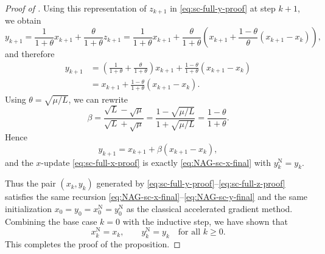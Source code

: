 \documentclass[10pt]{article}
\begin{document}
\begin{proof}[Proof of ]
Using this representation of \(z_{k+1}\) in \eqref{eq:sc-full-y-proof}
at step \(k+1\), we obtain
\[
y_{k+1}
=
\frac{1}{1+\theta}x_{k+1} + \frac{\theta}{1+\theta}z_{k+1}
=
\frac{1}{1+\theta}x_{k+1}
+
\frac{\theta}{1+\theta}\left(
x_{k+1} + \frac{1-\theta}{\theta}(x_{k+1}-x_k)
\right),
\]
and therefore
\begin{align*}
y_{k+1}
&=
\left(\frac{1}{1+\theta}+\frac{\theta}{1+\theta}\right)x_{k+1}
+
\frac{1-\theta}{1+\theta}(x_{k+1}-x_k)\\
&=
x_{k+1} + \frac{1-\theta}{1+\theta}(x_{k+1}-x_k).
\end{align*}
Using $\theta=\sqrt{\mu/L}$, we can rewrite
\[
\beta
=
\frac{\sqrt{L}-\sqrt{\mu}}{\sqrt{L}+\sqrt{\mu}}
=
\frac{1-\sqrt{\mu/L}}{1+\sqrt{\mu/L}}
=
\frac{1-\theta}{1+\theta}.
\]
Hence
\[
y_{k+1}
=
x_{k+1} + \beta(x_{k+1}-x_k),
\]
and the $x$-update \eqref{eq:sc-full-x-proof} is exactly
\eqref{eq:NAG-sc-x-final} with $y_k^{\mathrm N}=y_k$.

Thus the pair \((x_k,y_k)\) generated by
\eqref{eq:sc-full-y-proof}--\eqref{eq:sc-full-z-proof} satisfies the
same recursion \eqref{eq:NAG-sc-x-final}--\eqref{eq:NAG-sc-y-final}
and the same initialization \(x_0=y_0=x_0^{\mathrm N}=y_0^{\mathrm N}\)
as the classical accelerated gradient method.
Combining the base case $k=0$ with the inductive step, we have shown that
\[
x_k^{\mathrm N}=x_k,
\qquad
y_k^{\mathrm N}=y_k
\quad\text{for all }k\ge 0.
\]
This completes the proof of the proposition.
\end{proof}
\end{document}
